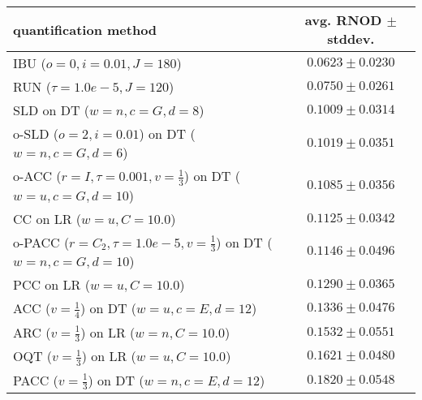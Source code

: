 \begin{tabular}{lc}
  \toprule
  quantification method & avg. RNOD $\pm$ stddev. \\
  \midrule
  IBU ($o=0, i=0.01, J=180$) & $\mathbf{0.0623 \pm 0.0230}$ \\
  RUN ($\tau=1.0e-5, J=120$) & $0.0750 \pm 0.0261$ \\
  SLD on DT ($w=n, c=G, d=8$) & $0.1009 \pm 0.0314$ \\
  o-SLD ($o=2, i=0.01$) on DT ($w=n, c=G, d=6$) & $0.1019 \pm 0.0351$ \\
  o-ACC ($r=I, \tau=0.001, v=\frac{1}{3}$) on DT ($w=u, c=G, d=10$) & $0.1085 \pm 0.0356$ \\
  CC on LR ($w=u, C=10.0$) & $0.1125 \pm 0.0342$ \\
  o-PACC ($r=C_2, \tau=1.0e-5, v=\frac{1}{3}$) on DT ($w=n, c=G, d=10$) & $0.1146 \pm 0.0496$ \\
  PCC on LR ($w=u, C=10.0$) & $0.1290 \pm 0.0365$ \\
  ACC ($v=\frac{1}{4}$) on DT ($w=u, c=E, d=12$) & $0.1336 \pm 0.0476$ \\
  ARC ($v=\frac{1}{3}$) on LR ($w=n, C=10.0$) & $0.1532 \pm 0.0551$ \\
  OQT ($v=\frac{1}{3}$) on LR ($w=u, C=10.0$) & $0.1621 \pm 0.0480$ \\
  PACC ($v=\frac{1}{3}$) on DT ($w=n, c=E, d=12$) & $0.1820 \pm 0.0548$ \\
  \bottomrule
\end{tabular}

